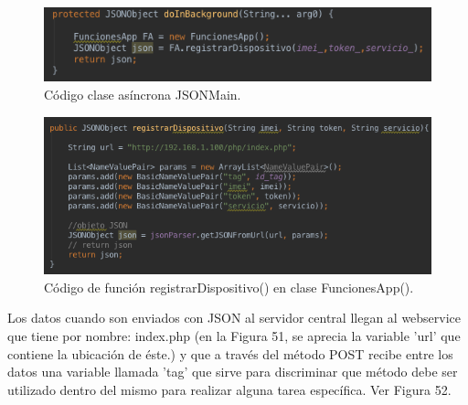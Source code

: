\begin{figure}[H]
\centering
\includegraphics[scale=0.70]{images/capitulo5/JSONMain.png}
\caption{Código clase asíncrona JSONMain.}
\label{registrarDispositivo}
\end{figure}

\begin{figure}[H]
\centering
\includegraphics[scale=0.70]{images/capitulo5/funcionRD.png}
\caption{Código de función registrarDispositivo() en clase FuncionesApp().}
\label{registrarDispositivo}
\end{figure}

Los datos cuando son enviados con JSON al servidor central llegan al webservice que tiene por nombre: index.php (en la Figura 51, se aprecia la variable 'url' que contiene la ubicación de éste.) y que a través del método POST recibe entre los datos una variable llamada 'tag' que sirve para discriminar que método debe ser utilizado dentro del mismo para realizar alguna tarea específica. Ver Figura 52.\\

